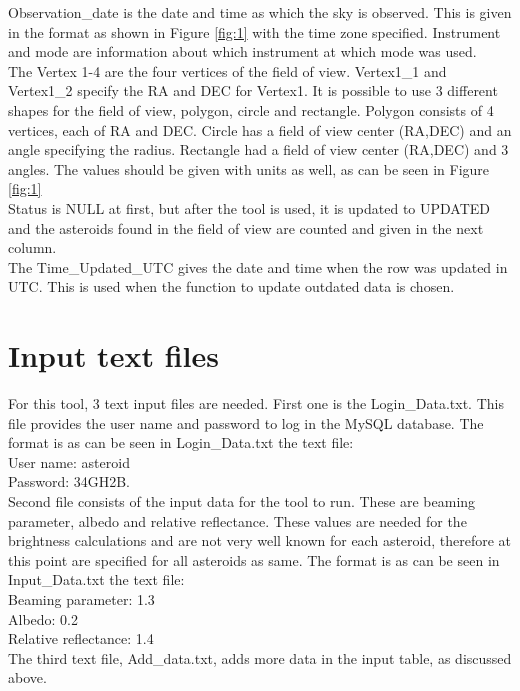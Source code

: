 Observation\_date is the date and time as which the sky is observed. This is given in the format as shown in Figure \ref{fig:1} with the time zone specified. Instrument and mode are information about which instrument at which mode was used.\\

The Vertex 1-4 are the four vertices of the field of view. Vertex1\_1 and Vertex1\_2 specify the RA and DEC for Vertex1. It is possible to use 3 different shapes for the field of view, polygon, circle and rectangle. Polygon consists of 4 vertices, each of RA and DEC. Circle has a field of view center (RA,DEC) and an angle specifying the radius. Rectangle had a field of view center (RA,DEC) and 3 angles. The values should be given with units as well, as can be seen in Figure \ref{fig:1}\\

Status is NULL at first, but after the tool is used, it is updated to UPDATED and the asteroids found in the field of view are counted and given in the next column.\\

The Time\_Updated\_UTC gives the date and time when the row was updated in UTC. This is used when the function to update outdated data is chosen. 

\section{Input text files}
For this tool, 3 text input files are needed. First one is the Login\_Data.txt. This file provides the user name and password to log in the MySQL database. The format is as can be seen in Login\_Data.txt the text file:\\
User name: asteroid\\
Password: 34GH2B. \\

Second file consists of the input data for the tool to run. These are beaming parameter, albedo and relative reflectance. These values are needed for the brightness calculations and are not very well known for each asteroid, therefore at this point are specified for all asteroids as same. 
The format is as can be seen in Input\_Data.txt the text file:\\
Beaming parameter: 1.3\\
Albedo: 0.2\\
Relative reflectance: 1.4 \\

The third text file, Add\_data.txt, adds more data in the input table, as discussed above. 

